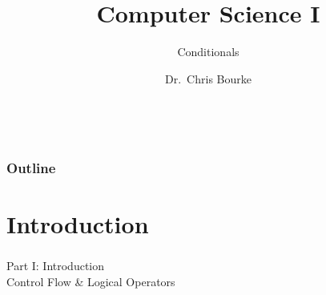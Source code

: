\documentclass[]{beamer}
\title[~]{Computer Science I}
\subtitle{Conditionals}
\author[~]{Dr.\ Chris Bourke\\ \email{cbourke@cse.unl.edu}} %
\date{~}
\begin{document}
\begin{frame}
  \titlepage
\end{frame}

%
%

\begin{frame}
  \frametitle{Outline}
{  
  \tableofcontents[hideallsubsections]
}
\end{frame}

\section{Introduction}

\begin{frame}
    \frametitle{}
    \framesubtitle{}
    
    \begin{center}
    {\Huge Part I: Introduction}\\
    {\Large Control Flow \& Logical Operators}
    \end{center}

\end{frame}
    
%
%
\end{document}
